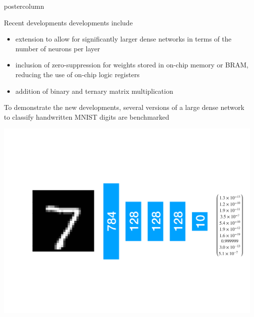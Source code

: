 \documentclass[final,hyperref={pdfpagelabels=false}]{beamer}
\begin{document}
\begin{frame}
\begin{columns}
\begin{column}{.49\textwidth}
\begin{beamercolorbox}[center,wd=\textwidth]{postercolumn}
\begin{minipage}[T]{.95\textwidth}
{\begin{block}{Recent developments}
                    developments include
                    \begin{itemize}
                    \item extension to allow for
                      significantly larger dense networks in terms of the number of neurons per layer
                    \item inclusion of zero-suppression for weights
                      stored in on-chip memory or BRAM, reducing the use of on-chip logic registers
                    \item addition of binary and ternary matrix multiplication
                    \end{itemize}
                \vspace{0.5in}
                    To demonstrate the new developments, several versions of a large dense network to classify handwritten MNIST digits are benchmarked
                    \begin{center}
                    \includegraphics[width=\linewidth]{MNIST_big.pdf}
                  \end{center}
                  \begin{center}
\end{center}
\end{block}}
\end{minipage}
\end{beamercolorbox}
\end{column}
\end{columns}
\end{frame}
\end{document}
